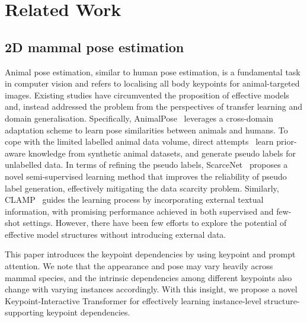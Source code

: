 \section{Related Work}
\label{sec_2}
\subsection{2D mammal pose estimation}
\label{subsec:rel_pe}
Animal pose estimation, similar to human pose estimation, is a fundamental task in computer vision and refers to localising all body keypoints for animal-targeted images.
Existing studies have circumvented the proposition of effective models and, instead addressed the problem from the perspectives of transfer learning and domain generalisation.
Specifically, AnimalPose~\cite{cao2019cross} leverages a cross-domain adaptation scheme to learn pose similarities between animals and humans.
To cope with the limited labelled animal data volume, direct attempts~\cite{mu2020learning,li2021synthetic} learn prior-aware knowledge from synthetic animal datasets, and generate pseudo labels for unlabelled data.
In terms of refining the pseudo labels, ScarceNet~\cite{li2023scarcenet} proposes a novel semi-supervised learning method that improves the reliability of pseudo label generation, effectively mitigating the data scarcity problem.
Similarly, CLAMP~\cite{zhang2023clamp} guides the learning process by incorporating external textual information, with promising performance achieved in both supervised and few-shot settings.
However, there have been few efforts to explore the potential of effective model structures without introducing external data.

This paper introduces the keypoint dependencies by using keypoint and prompt attention.
We note that the appearance and pose may vary heavily across mammal species, and the intrinsic dependencies among different keypoints also change with varying instances accordingly.
With this insight, we propose a novel Keypoint-Interactive Transformer for effectively learning instance-level structure-supporting keypoint dependencies.

